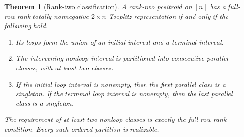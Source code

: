 \documentclass{amsart}
\numberwithin{equation}{section}
\newtheorem{theorem}{Theorem}
\theoremstyle{definition}
\theoremstyle{remark}
\begin{document}
\begin{theorem}[Rank-two classification]\label{thm:rank2}
A rank-two positroid on $[n]$ has a full-row-rank totally nonnegative $2\times n$ Toeplitz representation if and only if the following hold.
\begin{enumerate}
\item Its loops form the union of an initial interval and a terminal interval.
\item The intervening nonloop interval is partitioned into consecutive parallel classes, with at least two classes.
\item If the initial loop interval is nonempty, then the first parallel class is a singleton.  If the terminal loop interval is nonempty, then the last parallel class is a singleton.
\end{enumerate}
The requirement of at least two nonloop classes is exactly the full-row-rank condition.  Every such ordered partition is realizable.
\end{theorem}
\end{document}
